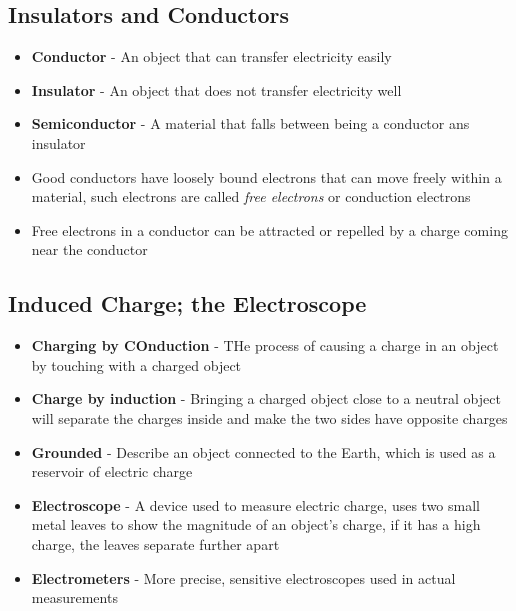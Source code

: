 \subsection{Insulators and Conductors}
\begin{itemize}
    \item \textbf{Conductor} - An object that can transfer electricity easily
    \item \textbf{Insulator} - An object that does not transfer electricity well
    \item \textbf{Semiconductor} - A material that falls between being a conductor ans insulator
    \item Good conductors have loosely bound electrons that can move freely within a material, such electrons are called \emph{free electrons} or conduction electrons
    \item Free electrons in a conductor can be attracted or repelled by a charge coming near the conductor
\end{itemize}

\subsection{Induced Charge; the Electroscope}
\begin{itemize}
    \item \textbf{Charging by COnduction} - THe process of causing a charge in an object by touching with a charged object
    \item \textbf{Charge by induction} - Bringing a charged object close to a neutral object will separate the charges inside and make the two sides have opposite charges
    \item \textbf{Grounded} - Describe an object connected to the Earth, which is used as a reservoir of electric charge
    \item \textbf{Electroscope} - A device used to measure electric charge, uses two small metal leaves to show the magnitude of an object's charge, if it has a high charge, the leaves separate further apart
    \item \textbf{Electrometers} - More precise, sensitive electroscopes used in actual measurements
\end{itemize}

